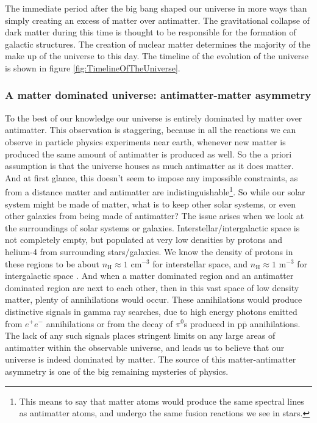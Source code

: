 The immediate period after the big bang shaped our universe in more ways than simply creating an excess of matter over antimatter. The gravitational collapse of dark matter during this time is thought to be responsible for the formation of galactic structures\cite{Ibarra_neutrinos}. The creation of nuclear matter determines the majority of the make up of the universe to this day. The timeline of the evolution of the universe is shown in figure \ref{fig:TimelineOfTheUniverse}.

\subsubsection{A matter dominated universe: antimatter-matter asymmetry}
To the best of our knowledge our universe is  entirely dominated by matter over antimatter. This observation is staggering, because in all the reactions we can observe in particle physics experiments near earth, whenever new matter is produced the same amount of antimatter is produced as well. So the a priori assumption is that the universe houses as much antimatter as it does matter. And at first glance, this doesn't seem to impose any impossible constraints, as from a distance matter and antimatter are indistinguishable\footnote{This means to say that matter atoms would produce the same spectral lines as antimatter atoms, and undergo the same fusion reactions we see in stars.}. So while our solar system might be made of matter, what is to keep other solar systems, or even other galaxies from being made of antimatter? The issue arises when we look at the surroundings of solar systems or galaxies. Interstellar/intergalactic space is not completely empty, but populated at very low densities by protons and helium-4 from surrounding stars/galaxies. We know the density of protons in these regions to be about $n_\mathrm{H} \approx 1$ cm$^{-3}$ for interstellar space\cite{}, and $n_\mathrm{H} \approx 1$ m$^{-3}$ for intergalactic space \cite{}. And when a matter dominated region and an antimatter dominated region are next to each other, then in this vast space of low density matter, plenty of annihilations would occur. These annihilations would produce distinctive signals in gamma ray searches, due to high energy photons emitted from $e^+e^-$ annihilations or from the decay of $\pi^0$s produced in $\mathrm{p}\overline{\mathrm{p}}$ annihilations\cite{Schönfelder1989}. The lack of any such signals places stringent limits on any large areas of antimatter within the observable universe, and leads us to believe that our universe is indeed dominated by matter. The source of this matter-antimatter asymmetry is one of the big remaining mysteries of physics.  \\

